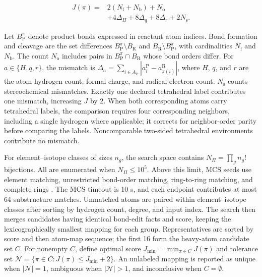 \begin{equation}\label{eq:methods-01}
\begin{aligned}
J(\pi)={}&2(N_{\mathrm{f}}+N_{\mathrm{b}})+N_{\mathrm{o}}\\
&+4\Delta_H+8\Delta_q+8\Delta_r+2N_{\mathrm{s}}.
\end{aligned}
\end{equation}

Let $B_{\mathrm{P}}^\pi$ denote product bonds expressed in reactant atom indices. Bond formation and cleavage are the set differences $B_{\mathrm{P}}^\pi\setminus B_{\mathrm{R}}$ and $B_{\mathrm{R}}\setminus B_{\mathrm{P}}^\pi$, with cardinalities $N_{\mathrm{f}}$ and $N_{\mathrm{b}}$. The count $N_{\mathrm{o}}$ includes pairs in $B_{\mathrm{P}}^\pi\cap B_{\mathrm{R}}$ whose bond orders differ. For $a\in\{H,q,r\}$, the mismatch is $\Delta_a=\sum_{i\in A_{\mathrm{P}}}|a_i^{\mathrm{P}}-a_{\pi(i)}^{\mathrm{R}}|$, where $H$, $q$, and $r$ are the atom hydrogen count, formal charge, and radical-electron count. $N_{\mathrm{s}}$ counts stereochemical mismatches. Exactly one declared tetrahedral label contributes one mismatch, increasing $J$ by 2. When both corresponding atoms carry tetrahedral labels, the comparison requires four corresponding neighbors, including a single hydrogen where applicable; it corrects for neighbor-order parity before comparing the labels. Noncomparable two-sided tetrahedral environments contribute no mismatch.

For element–isotope classes of sizes $n_g$, the search space contains $N_\Pi=\prod_g n_g!$ bijections. All are enumerated when $N_\Pi\le 10^5$. Above this limit, MCS seeds use element matching, unrestricted bond-order matching, ring-to-ring matching, and complete rings \citep{ref13}. The MCS timeout is 10 s, and each endpoint contributes at most 64 substructure matches. Unmatched atoms are paired within element–isotope classes after sorting by hydrogen count, degree, and input index. The search then merges candidates having identical bond-edit facts and score, keeping the lexicographically smallest mapping for each group. Representatives are sorted by score and then atom-map sequence; the first 16 form the heavy-atom candidate set $C$. For nonempty $C$, define optimal score $J_{\min}=\min_{\pi\in C}J(\pi)$ and tolerance set $\mathcal{N}=\{\pi\in C:J(\pi)\le J_{\min}+2\}$. An unlabeled mapping is reported as unique when $|\mathcal{N}|=1$, ambiguous when $|\mathcal{N}|>1$, and inconclusive when $C=\emptyset$.

